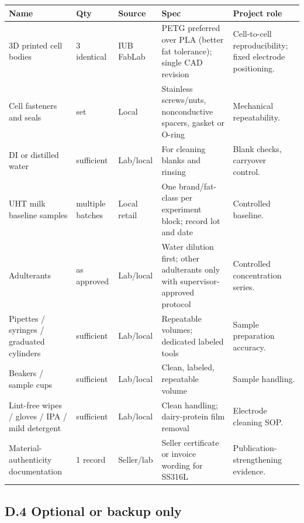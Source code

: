 \documentclass[11pt,a4paper]{article}
\begin{document}
\begin{xltabular}{\textwidth}{L{34mm}L{15mm}L{32mm}L{45mm}Y}
\toprule
\textbf{Name} & \textbf{Qty} & \textbf{Source} & \textbf{Spec} & \textbf{Project role}\\
\midrule
3D printed cell bodies & 3 identical & IUB FabLab & PETG preferred over PLA (better fat tolerance); single CAD revision & Cell-to-cell reproducibility; fixed electrode positioning.\\
Cell fasteners and seals & set & Local & Stainless screws/nuts, nonconductive spacers, gasket or O-ring & Mechanical repeatability.\\
DI or distilled water & sufficient & Lab/local & For cleaning blanks and rinsing & Blank checks, carryover control.\\
UHT milk baseline samples & multiple batches & Local retail & One brand/fat-class per experiment block; record lot and date & Controlled baseline.\\
Adulterants & as approved & Lab/local & Water dilution first; other adulterants only with supervisor-approved protocol & Controlled concentration series.\\
Pipettes / syringes / graduated cylinders & sufficient & Lab/local & Repeatable volumes; dedicated labeled tools & Sample preparation accuracy.\\
Beakers / sample cups & sufficient & Lab/local & Clean, labeled, repeatable volume & Sample handling.\\
Lint-free wipes / gloves / IPA / mild detergent & sufficient & Lab/local & Clean handling; dairy-protein film removal & Electrode cleaning SOP.\\
Material-authenticity documentation & 1 record & Seller/lab & Seller certificate or invoice wording for SS316L & Publication-strengthening evidence.\\
\bottomrule
\end{xltabular}

\subsection{D.4 Optional or backup only}
\end{document}
